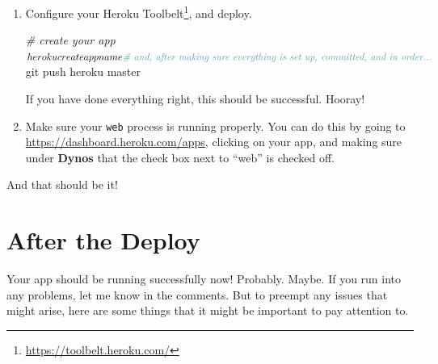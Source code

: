 \documentclass[]{article}
\newenvironment{Shaded}{}{}
\newcommand{\CommentTok}[1]{\textcolor[rgb]{0.38,0.63,0.69}{\textit{#1}}}
\newcommand{\ExtensionTok}[1]{#1}
\newcommand{\NormalTok}[1]{#1}
\renewcommand{\href}[2]{#2\footnote{\url{#1}}}
\begin{document}
\begin{enumerate}
  But hey, if you use any node packages or gems or python packages in your
  project, then you can actually use this to your advantage! I personally use
  \emph{\href{http://compass-style.org/}{compass}} a lot for their extensions to
  \emph{sass}, so adding it is as simple as using a \emph{Gemfile} --- just like
  in any normal ruby app.

  If you want to mix and match libraries from different languages/ecosystems,
  you can use the
  \href{https://github.com/ddollar/heroku-buildpack-multi}{multi} buildpack and
  have Heroku check for packages in all of the normal package managers of the
  languages you specify.
\item
  Configure your \href{https://toolbelt.heroku.com/}{Heroku Toolbelt}, and
  deploy.

\begin{Shaded}
\begin{Highlighting}[]
\CommentTok{\#   create your app}
\ExtensionTok{$}\NormalTok{ heroku create appname}
\CommentTok{\#   and, after making sure everything is set up, committed, and in order...}
\ExtensionTok{$}\NormalTok{ git push heroku master}
\end{Highlighting}
\end{Shaded}

  If you have done everything right, this should be successful. Hooray!
\item
  Make sure your \texttt{web} process is running properly. You can do this by
  going to \url{https://dashboard.heroku.com/apps}, clicking on your app, and
  making sure under \textbf{Dynos} that the check box next to ``web'' is checked
  off.
\end{enumerate}

And that should be it!

\section{After the Deploy}\label{after-the-deploy}

Your app should be running successfully now! Probably. Maybe. If you run into
any problems, let me know in the comments. But to preempt any issues that might
arise, here are some things that it might be important to pay attention to.
\end{document}
